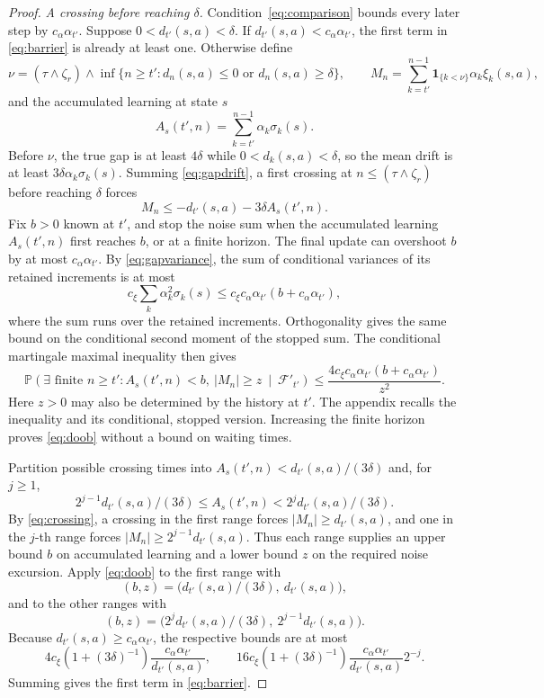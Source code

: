 \begin{proof}
\emph{A crossing before reaching $\delta$.} Condition~\eqref{eq:comparison} bounds every later step by $c_\alpha\alpha_{t'}$. Suppose $0<d_{t'}(s,a)<\delta$. If $d_{t'}(s,a)<c_\alpha\alpha_{t'}$, the first term in \eqref{eq:barrier} is already
at least one. Otherwise define
\[
\nu=(\tau\wedge\zeta_r)\wedge\inf\{n\ge t':d_n(s,a)\le0\text{ or }d_n(s,a)\ge\delta\},\qquad
M_n=\sum_{k=t'}^{n-1}\mathbf1_{\{k<\nu\}}\alpha_k\xi_k(s,a),
\]
and the accumulated learning at state $s$
\begin{equation}\label{eq:clock}
A_s(t',n)=\sum_{k=t'}^{n-1}\alpha_k\sigma_k(s).
\end{equation}
Before $\nu$, the true gap is at least $4\delta$ while $0<d_k(s,a)<\delta$, so the mean drift is at least $3\delta\alpha_k\sigma_k(s)$. Summing \eqref{eq:gapdrift}, a first crossing at $n\le(\tau\wedge\zeta_r)$ before reaching $\delta$ forces
\begin{equation}\label{eq:crossing}
M_n\le-d_{t'}(s,a)-3\delta A_s(t',n).
\end{equation}
Fix $b>0$ known at $t'$, and stop the noise sum when the accumulated learning $A_s(t',n)$ first reaches $b$, or at a finite horizon. The final update can overshoot $b$ by at most $c_\alpha\alpha_{t'}$. By \eqref{eq:gapvariance}, the sum of conditional variances of its retained increments is at most
\[
c_\xi\sum_k\alpha_k^2\sigma_k(s)
\le c_\xi c_\alpha\alpha_{t'}(b+c_\alpha\alpha_{t'}),
\]
where the sum runs over the retained increments. Orthogonality gives the same bound on the conditional second moment of the stopped sum. The conditional martingale maximal inequality then gives
\begin{equation}\label{eq:doob}
\mathbb P\!\left(\exists\text{ finite }n\ge t':
A_s(t',n)<b,\ |M_n|\ge z\ \middle|\ \mathcal F'_{t'}\right)
\le\frac{4c_\xi c_\alpha\alpha_{t'}(b+c_\alpha\alpha_{t'})}{z^2}.
\end{equation}
Here $z>0$ may also be determined by the history at $t'$. The appendix recalls the inequality and its conditional, stopped version. Increasing the finite horizon proves \eqref{eq:doob} without a bound on waiting times.

Partition possible crossing times into $A_s(t',n)<d_{t'}(s,a)/(3\delta)$ and, for $j\ge1$,
\[
2^{j-1}d_{t'}(s,a)/(3\delta)\le A_s(t',n)<2^jd_{t'}(s,a)/(3\delta).
\]
By \eqref{eq:crossing}, a crossing in the first range forces $|M_n|\ge d_{t'}(s,a)$, and one in the $j$-th range forces $|M_n|\ge2^{j-1}d_{t'}(s,a)$. Thus each range supplies an upper bound $b$ on accumulated learning and a lower bound $z$ on the required noise excursion. Apply \eqref{eq:doob} to the first range with
\[
(b,z)=\big(d_{t'}(s,a)/(3\delta),\ d_{t'}(s,a)\big),
\]
and to the other ranges with
\[
(b,z)=\big(2^jd_{t'}(s,a)/(3\delta),\ 2^{j-1}d_{t'}(s,a)\big).
\]
Because $d_{t'}(s,a)\ge c_\alpha\alpha_{t'}$, the respective bounds are at most
\[
4c_\xi(1+(3\delta)^{-1})\frac{c_\alpha\alpha_{t'}}{d_{t'}(s,a)},\qquad
16c_\xi(1+(3\delta)^{-1})\frac{c_\alpha\alpha_{t'}}{d_{t'}(s,a)}2^{-j}.
\]
Summing gives the first term in \eqref{eq:barrier}.


\end{proof}
